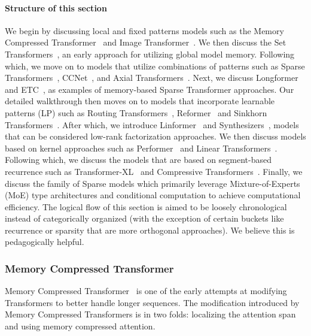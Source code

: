 \paragraph{Structure of this section} We begin by discussing local and fixed patterns models such as the Memory Compressed Transformer~\citep{liu2018generating} and Image Transformer~\citep{parmar2018image}. We then discuss the Set Transformers~\citep{lee2019set}, an early approach for utilizing global model memory. Following which, we move on to models that utilize combinations of patterns such as Sparse Transformers~\citep{child2019generating}, CCNet~\citep{huang2019ccnet}, and Axial Transformers~\citep{ho2019axial}. Next, we discuss Longformer~\citep{beltagy2020longformer} and ETC~\citep{ainslie2020etc}, as examples of memory-based Sparse Transformer  approaches. Our detailed walkthrough then moves on to models that incorporate learnable patterns (LP) such as Routing Transformers~\citep{roy2020efficient}, Reformer~\citep{kitaev2020reformer} and Sinkhorn Transformers~\citep{tay2020sparse}. After which, we introduce Linformer~\citep{wang2020linformer} and Synthesizers~\citep{tay2020synthesizer}, models that can be considered low-rank factorization approaches. We then discuss models based on kernel approaches such as Performer~\citep{choromanski2020masked} and Linear Transformers~\citep{katharopoulos2020transformers}. Following which, we discuss the models that are based on segment-based recurrence such as Transformer-XL~\citep{dai2019transformer} and Compressive Transformers~\citep{rae2020compressive}. Finally, we discuss the family of Sparse models which primarily leverage Mixture-of-Experts (MoE) type architectures and conditional computation to achieve computational efficiency. The logical flow of this section is aimed to be loosely chronological instead of categorically organized (with the exception of certain buckets like recurrence or sparsity that are more orthogonal approaches). We believe this is pedagogically helpful.  

\subsubsection{Memory Compressed Transformer} Memory Compressed Transformer~\citep{liu2018generating} is one of the early attempts at modifying Transformers to better handle longer sequences. The modification introduced by Memory Compressed Transformers is in two folds: localizing the attention span and using memory compressed attention.  

